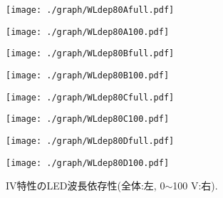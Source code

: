 \begin{figure}[H]
\begin{minipage}{0.55\hsize}
	\centering
	\texttt{[image: ./graph/WLdep80Afull.pdf]}
\end{minipage}
\begin{minipage}{0.45\hsize}
	\centering
	\texttt{[image: ./graph/WLdep80A100.pdf]}
\end{minipage}
\begin{minipage}{0.55\hsize}
	\centering
	\texttt{[image: ./graph/WLdep80Bfull.pdf]}
\end{minipage}
\begin{minipage}{0.45\hsize}
	\centering
	\texttt{[image: ./graph/WLdep80B100.pdf]}
\end{minipage}
\begin{minipage}{0.55\hsize}
	\centering
	\texttt{[image: ./graph/WLdep80Cfull.pdf]}
\end{minipage}
\begin{minipage}{0.45\hsize}
	\centering
	\texttt{[image: ./graph/WLdep80C100.pdf]}
\end{minipage}
\begin{minipage}{0.55\hsize}
	\centering
	\texttt{[image: ./graph/WLdep80Dfull.pdf]}
\end{minipage}
\begin{minipage}{0.45\hsize}
	\centering
	\texttt{[image: ./graph/WLdep80D100.pdf]}
\end{minipage}
 	\caption{IV特性のLED波長依存性(全体:左, 0$\sim$100 V:右).}
	\label{fig:WLdep}
\end{figure}
